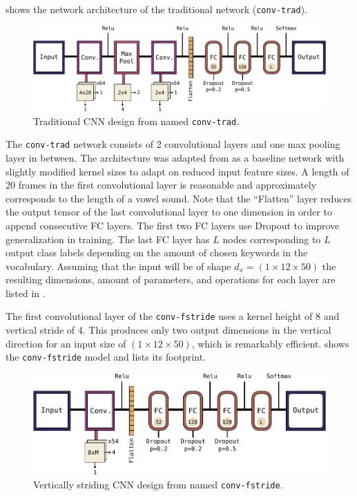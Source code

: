  shows the network architecture of the traditional network (\texttt{conv-trad}).
\begin{figure}[!ht]
  \centering
    \includegraphics[height=0.23\textwidth]{./4_nn/figs/nn_arch_cnn_trad.pdf}
  \caption{Traditional CNN design from \cite{Sainath2015} named \texttt{conv-trad}.}
  \label{fig:nn_arch_cnn_trad}
\end{figure}
\FloatBarrier
\noindent
The \texttt{conv-trad} network consists of 2 convolutional layers and one max pooling layer in between.
The architecture was adapted from \cite{Sainath2015} as a baseline network with slightly modified kernel sizes to adapt on reduced input feature sizes.
A length of 20 frames in the first convolutional layer is reasonable and approximately corresponds to the length of a vowel sound.
Note that the \enquote{Flatten} layer reduces the output tensor of the last convolutional layer to one dimension in order to append consecutive FC layers.
The first two FC layers use Dropout to improve generalization in training.
The last FC layer has $L$ nodes corresponding to $L$ output class labels depending on the amount of chosen keywords in the vocabulary.
Assuming that the input will be of shape $d_x = (1 \times 12 \times 50)$ the resulting dimensions, amount of parameters, and operations for each layer are listed in .


The first convolutional layer of the \texttt{conv-fstride} uses a kernel height of 8 and vertical stride of 4.
This produces only two output dimensions in the vertical direction for an input size of $(1 \times 12 \times 50)$, which is remarkably efficient.
 shows the \texttt{conv-fstride} model and  lists its footprint.
\begin{figure}[!ht]
  \centering
    \includegraphics[height=0.23\textwidth]{./4_nn/figs/nn_arch_cnn_fstride.pdf}
  \caption{Vertically striding CNN design from \cite{Sainath2015} named \texttt{conv-fstride}.}
  \label{fig:nn_arch_cnn_fstride}
\end{figure}
\FloatBarrier
\noindent


